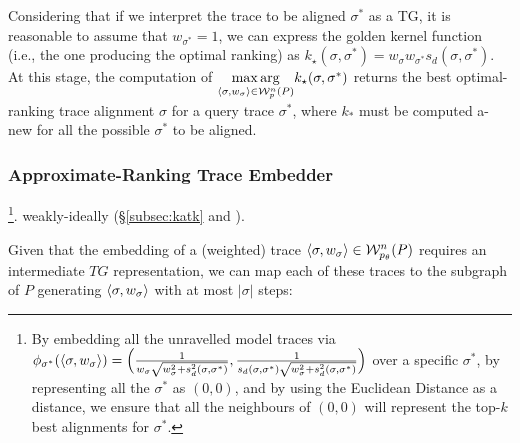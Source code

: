 {Considering that if we interpret the trace to be aligned $\sigma^*$ as a TG, it is reasonable to assume that $w_{\sigma^*}=1$, we can express the golden kernel function (i.e., the one producing the optimal ranking) as $k_\star(\sigma,\sigma^*)=w_\sigma w_{\sigma^*} s_d(\sigma,\sigma^*)$. At this stage, the computation of $\underset{\braket{\sigma,w_\sigma}\in \mathcal{W}_p^n(P)}{\max\arg} k_\star(\sigma, {\sigma^*})$ returns the best optimal-ranking trace alignment $\sigma$ for a query trace $\sigma^*$, where $k_\ast$ must be computed a-new for all the possible $\sigma^*$ to be aligned. 
	
	
	

\subsubsection{Approximate-Ranking Trace Embedder}\label{subsec:ate}
\footnote{By embedding  all the unravelled model traces via $\phi_{\sigma^*}(\braket{\sigma,w_\sigma})=\Big(\frac{1}{w_\sigma\sqrt{w_\sigma^2+s_d^2(\sigma,\sigma^*)}},\frac{1}{s_d(\sigma,\sigma^*)\sqrt{w_\sigma^2+s_d^2(\sigma,\sigma^*)}}\Big)$ over a specific $\sigma^*$, by representing all the $\sigma^*$ as $(0,0)$, and by using the Euclidean Distance as a distance, we ensure that all the neighbours of $(0,0)$ will represent the top-$k$ best alignments for $\sigma^*$.}.   weakly-ideally (\S\ref{subsec:katk} and \cite{Gartner03}). 

Given that the embedding of a (weighted) trace $\braket{\sigma,w_\sigma}\in\mathcal{W}_{p_\theta}^n(P)$ requires an intermediate $TG$ representation, we can map each of these traces to the subgraph of $P$ generating $\braket{\sigma,w_\sigma}$ with at most $|\sigma|$ steps:}
